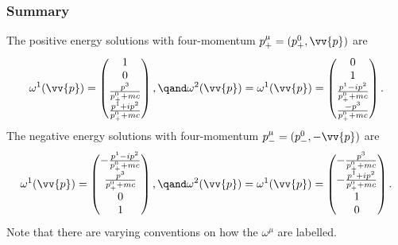 \subsubsection{Summary}
The positive energy solutions with four-momentum \(p^\mu_+ = (p^0_+, \vv{p})\) are
\begin{equation}
    \omega^1(\vv{p}) =
    \begin{pmatrix}
        1\\ 0\\
        \frac{p^3}{p^0_+ + mc}\\
        \frac{p^1 + ip^2}{p^0_+ + mc}
    \end{pmatrix}
    ,\qand \omega^2(\vv{p}) = 
    \omega^1(\vv{p}) =
    \begin{pmatrix}
        0\\ 1\\
        \frac{p^1 - ip^2}{p^0_+ + mc}\\
        \frac{-p^3}{p^0_+ + mc}
    \end{pmatrix}
    .
\end{equation}
The negative energy solutions with four-momentum \(p^\mu_- = (p^0_-, -\vv{p})\) are
\begin{equation}
    \omega^1(\vv{p}) =
    \begin{pmatrix}
        -\frac{p^1 - ip^2}{p^0_+ + mc}\\
        \frac{p^3}{p^0_+ + mc}\\
        0\\ 1
    \end{pmatrix}
    ,\qand \omega^2(\vv{p}) = 
    \omega^1(\vv{p}) =
    \begin{pmatrix}
        -\frac{p^3}{p^0_+ + mc}\\
        -\frac{p^1 + ip^2}{p^0_+ + mc}\\
        1\\ 0
    \end{pmatrix}
    .
\end{equation}
Note that there are varying conventions on how the \(\omega^\mu\) are labelled.

